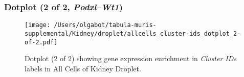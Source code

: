 \clearpage

\subsubsection{Dotplot (2 of 2, \emph{Podxl}--\emph{Wt1})}
\begin{figure}[h]
\centering
\texttt{[image: /Users/olgabot/tabula-muris-supplemental/Kidney/droplet/allcells\_cluster-ids\_dotplot\_2-of-2.pdf]}

\caption{ Dotplot (2 of 2)  showing gene expression enrichment in \emph{Cluster IDs} labels in All Cells of Kidney Droplet. }
\end{figure}

